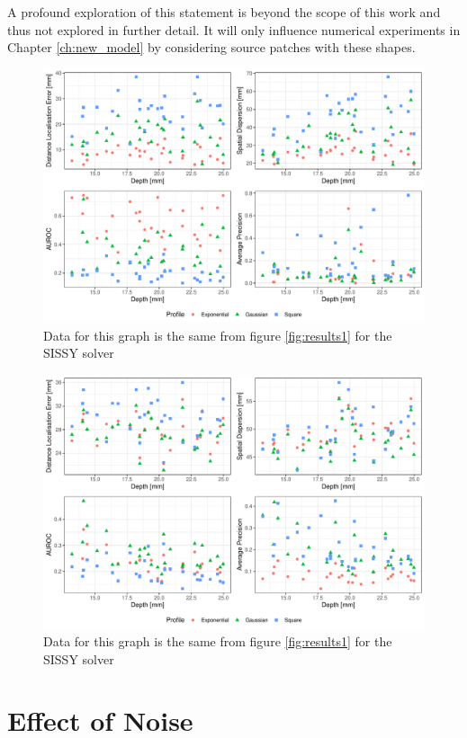 A profound exploration of this statement is beyond the scope of this work and thus not explored in further detail.
%
It will only influence numerical experiments in Chapter \ref{ch:new_model} by considering source patches with these shapes.

\begin{figure}
    \centering
    \includegraphics[width=0.9\linewidth]{img_stats/SISSY_scatter_EvalMetrics_Protocol04_30.pdf}
    \caption{Data for this graph is the same from figure \ref{fig:results1} for the SISSY solver}
    \label{fig:deets_SISSY}
\end{figure}

\begin{figure}
    \centering
    \includegraphics[width=0.9\linewidth]{img_stats/sLORETA_scatter_EvalMetrics_Protocol04_30.pdf}
    \caption{Data for this graph is the same from figure \ref{fig:results1} for the SISSY solver}
    \label{fig:deets_sLORETA}
\end{figure}

\section{Effect of Noise}

